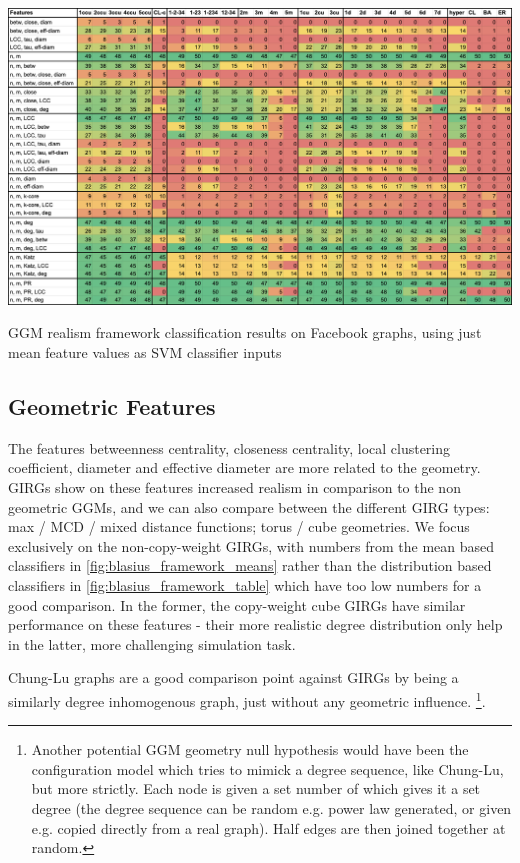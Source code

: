 \begin{table}
    \centering
    \includegraphics[width=\textwidth]{./figures/blasius_framework_means.png}
    \caption{GGM realism framework classification results on Facebook graphs, using just mean feature values as SVM classifier inputs}
    \label{fig:blasius_framework_means}
\end{table}


\subsection{Geometric Features}
The features betweenness centrality, closeness centrality, local clustering coefficient, diameter and effective diameter are more related to the geometry. GIRGs show on these features increased realism in comparison to the non geometric GGMs, and we can also compare between the different GIRG types: max / MCD / mixed distance functions; torus / cube geometries. We focus exclusively on the non-copy-weight GIRGs, with numbers from the mean based classifiers in \cref{fig:blasius_framework_means} rather than the distribution based classifiers in \cref{fig:blasius_framework_table} which have too low numbers for a good comparison. In the former, the copy-weight cube GIRGs have similar performance on these features - their more realistic degree distribution only help in the latter, more challenging simulation task.


Chung-Lu graphs are a good comparison point against GIRGs by being a similarly degree inhomogenous graph, just without any geometric influence.
\footnote{Another potential GGM geometry null hypothesis would have been the configuration model which tries to mimick a degree sequence, like Chung-Lu, but more strictly. Each node is given a set number of  which gives it a set degree (the degree sequence can be random e.g. power law generated, or given e.g. copied directly from a real graph). Half edges are then joined together at random.}.



